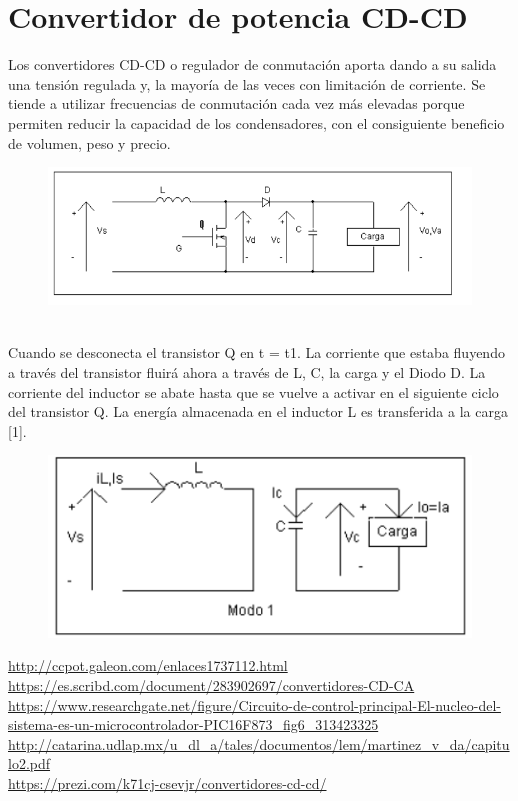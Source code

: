 \documentclass[11pt]{article}
\begin{document}
\section{Convertidor de potencia CD-CD}
Los convertidores CD-CD o regulador de conmutaci\'on aporta dando a su salida una tensi\'on regulada y, la mayor\'ia de las veces con limitaci\'on de corriente. Se tiende a utilizar frecuencias de conmutaci\'on cada vez m\'as elevadas porque permiten reducir la capacidad de los condensadores, con el consiguiente beneficio de volumen, peso y precio.\\
\begin{figure}[htp]
\centering
\includegraphics[scale=.50]{CD-CD.png}
\caption{}
\label{}
\end{figure}\\
Cuando  se  desconecta  el  transistor  Q  en  t  =  t1.  La  corriente  que  estaba  fluyendo  a  trav\'es  del  transistor  fluirá ahora a través de L, C, la carga y el Diodo D. La corriente del inductor se abate hasta que  se  vuelve  a  activar  en  el  siguiente  ciclo  del  transistor  Q.  La  energía  almacenada  en  el  inductor  L  es  transferida  a  la  carga  [1].
\begin{figure}[htp]
\centering
\includegraphics[scale=.70]{Cd-Cd.png}
\caption{}
\label{}
\end{figure}

{}

\url {http://ccpot.galeon.com/enlaces1737112.html}\\
\url {https://es.scribd.com/document/283902697/convertidores-CD-CA}\\
\url {https://www.researchgate.net/figure/Circuito-de-control-principal-El-nucleo-del-sistema-es-un-microcontrolador-PIC16F873_fig6_313423325}\\
\url  { http://catarina.udlap.mx/u_dl_a/tales/documentos/lem/martinez_v_da/capitulo2.pdf}\\
\url {https://prezi.com/k71cj-csevjr/convertidores-cd-cd/}\\
\end{document}
